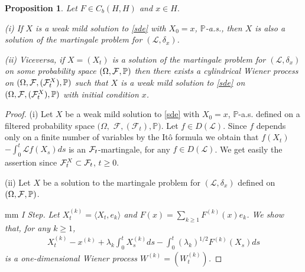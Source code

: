 \documentclass[preprint]{imsart}
\newtheorem{proposition}[theorem]{Proposition}
\def\P{\mathbb P}
\def\L{\mathcal L}
\begin{document}
\begin{proposition} \label{ser}  Let   $F \in C_b (H,H)$  and $x \in H.$   

(i)  If $X$ is a weak mild solution to \eqref{sde}    with $X_0 = x$, $\P$-a.s.,  then
 $X$ is also 
a  solution  of the martingale
problem for $(\L, \delta_x)$.


(ii) Viceversa, if $X= (X_t)$ is  a  solution of the martingale
problem for $(\L,  \delta_x)$ on some probability space $(\Omega, {\cal F}, \P)$ then there exists a cylindrical Wiener process on $(\Omega, {\cal F},({\cal F}_t^X), \P)$ such that 
$X$ is  a weak mild solution to \eqref{sde}  
  on $(\Omega, {\cal F},({\cal F}_t^X), \P)$
with initial
condition $x$. 
\end{proposition}
\begin{proof}(i) Let   $X$ be  a weak mild solution to \eqref{sde} with $X_0 = x$, $\P$-a.s.
 defined on  a filtered probability space $(
\Omega,$ $ {\mathcal F},
 ({\mathcal F}_{t}), \P) $. Let $f \in D(\L)$. Since  $f$ depends only on a finite number of variables  by the It\^o formula   
  we obtain that
$
f(X_t) $ $ - \int_0^t \L f(X_s) ds
$
 is an ${\cal F}_t$-martingale, for any $f \in D(\L)$. 
 We get easily  the assertion since ${\cal F}_t^X \subset 
{\cal F}_t$, $t \ge 0$. 




\vskip 1mm \noindent  (ii)  Let $X$ be a solution to the martingale problem
 for $(\L, \delta_x)$ defined on $(\Omega, {\cal F}, \P) $.

 mm       
\noindent  \textit{I Step.}  {\it Let $X^{(k)}_t = \langle X_t, e_k \rangle $ and $F(x) = \sum_{k \ge 1} F^{(k)}(x) e_k$.
We show that, for any $k \ge 1$,
$$
 \begin{array}{l}
X^{(k)}_t - x^{(k)} + \lambda_k\int_0^t X^{(k)}_s ds - \int_0^t (\lambda_k)^{1/2}F^{(k)}(X_s) ds
\end{array} 
$$
is a one-dimensional Wiener process $W^{(k)}= (W^{(k)}_t)$.}
 

\end{proof}
\end{document}
